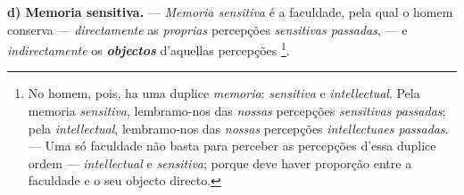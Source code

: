 \textbf{d) Memoria sensitiva.} --- \emph{Memoria sensitiva} é a faculdade, pela qual o homem conserva --- \emph{directamente} as \emph{proprias} percepções \emph{sensitivas passadas}, --- e \emph{indirectamente} os \textbf{\emph{objectos}} d'aquellas percepções \footnote{No homem, pois, ha uma duplice \emph{memoria}: \emph{sensitiva} e \emph{intellectual}. Pela memoria \emph{sensitiva}, lembramo-nos das \emph{nossas} percepções \emph{sensitivas passadas}; pela \emph{intellectual}, lembramo-nos das \emph{nossas} percepções \emph{intellectuaes passadas}. --- Uma só faculdade não basta para perceber as percepções d'essa duplice ordem --- \emph{intellectual} e \emph{sensitiva}; porque deve haver proporção entre a faculdade e o seu objecto directo.}.


 
